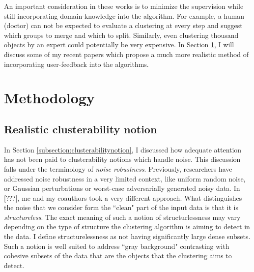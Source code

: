 \documentclass[11pt]{article}
\begin{document}
\vspace{0.1in}\noindent An important consideration in these works is to minimize the supervision while still incorporating domain-knowledge into the algorithm. For example, a human (doctor) can not be expected to evaluate a clustering at every step and suggest which groups to merge and which to split. Similarly, even clustering thousand objects by an expert could potentially be very expensive. In Section \ref{section:methodology}, I will discuss some of my recent papers which propose a much more realistic method of incorporating user-feedback into the algorithms.


\section{Methodology}
\label{section:methodology}
\subsection{Realistic clusterability notion}
In Section \ref{subsection:clusterabilitynotion}, I discussed how adequate attention has not been paid to clusterability notions which handle noise. This discussion falls under the terminology of \textit{noise robustness}. Previously, researchers have addressed noise robustness in a very limited context, like uniform random noise, or Gaussian perturbations or worst-case adversarially generated noisy data. In {\color{red} [???]}, me and my coauthors took a very different approach. What distinguishes the noise that we consider form the ``clean" part of the input data is that it is \emph{structureless}. The exact meaning of such a notion of structurlessness may vary depending on the type of structure the clustering algorithm is aiming to detect in the data. I define structurelessness as  not having significantly large dense subsets. Such a notion is well suited to address ``gray background" contrasting with cohesive subsets of the data that are the objects that the clustering aims to detect. 

\end{document}
